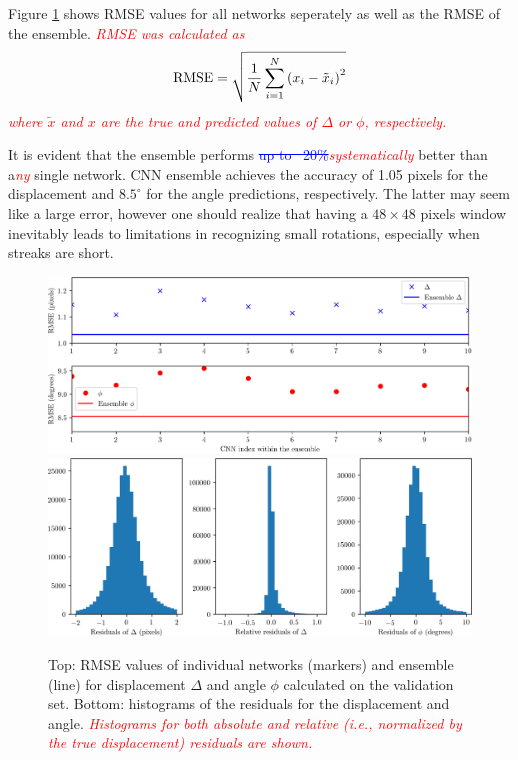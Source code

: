\documentclass{svjour3}                     %
\newcommand{\new}[1]{\textit{\textcolor{red}{#1}}}
\newcommand{\old}[1]{\textcolor{blue}{\sout{#1}}}
\begin{document}
Figure \ref{fig:fig3} shows RMSE values for all networks seperately as well as the RMSE of the ensemble. \new{RMSE was calculated as} 
\begin{equation}
\textnormal{RMSE} = \sqrt{\frac{1}{N}\sum_{i = 1}^N{\left(x_i - \tilde{x}_i\right)^2}}
\end{equation}
\new{where $\tilde{x}$ and $x$ are the true and predicted values of $\Delta$ or $\phi$, respectively.}

It is evident that the ensemble performs \old{up to ~20\%}\new{systematically} better than a\new{ny} single network. CNN ensemble achieves the accuracy of 1.05 pixels for the displacement and $8.5^{\circ}$ for the angle predictions, respectively. The latter may seem like a large error, however one should realize that having a $48 \times 48$ pixels window inevitably leads to limitations in recognizing small rotations, especially when streaks are short. 

\begin{figure}
\includegraphics[width=\textwidth]{figs/figure2a.png}
\includegraphics[width=\textwidth]{figs/figure2b.png}
\caption{Top: RMSE values of individual networks (markers) and ensemble (line) for displacement $\Delta$ and angle $\phi$ calculated on the validation set. Bottom: histograms of the residuals for the displacement and angle. \new{Histograms for both absolute and relative (i.e., normalized by the true displacement) residuals are shown.}}
\label{fig:fig3}
\end{figure}
\end{document}
